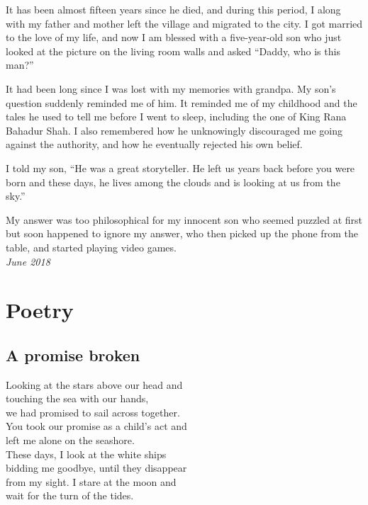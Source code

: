\documentclass[oneside,12pt]{book}
\begin{document}
It has been almost fifteen years since he died, and during this period, I along with my father and mother left the village and migrated to the city. I got married to the love of my life, and now I am blessed with a five-year-old son who just looked at the picture on the living room walls and asked “Daddy, who is this man?” 

It had been long since I was lost with my memories with grandpa. My son’s question suddenly reminded me of him. It reminded me of my childhood and the tales he used to tell me before I went to sleep, including the one of King Rana Bahadur Shah. I also remembered how he unknowingly discouraged me going against the authority, and how he eventually rejected his own belief. 

I told my son, “He was a great storyteller. He left us years back before you were born and these days, he lives among the clouds and is looking at us from the sky.” 

My answer was too philosophical for my innocent son who seemed puzzled at first but soon happened to ignore my answer, who then picked up the phone from the table, and started playing video games. \\

\textit{June 2018}


\linespread{0.6}
\chapter*{Poetry}

\section*{A promise broken}
Looking at the stars above our head and  \\
touching the sea with our hands, \\
we had promised to sail across together. \\
You took our promise as a child’s act and \\
left me alone on the seashore. \\
These days, I look at the white ships \\
bidding me goodbye, until they disappear \\ 
from my sight. I stare at the moon and \\
wait for the turn of the tides. \\\\\\\\
\end{document}
